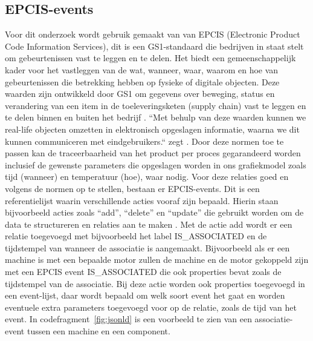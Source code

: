 \subsection{EPCIS-events}
Voor dit onderzoek wordt gebruik gemaakt van van EPCIS (Electronic Product Code Information Services), dit is een GS1-standaard die bedrijven in staat stelt om gebeurtenissen vast te leggen en te delen. 
Het biedt een gemeenschappelijk kader voor het vastleggen van de wat, wanneer, waar, waarom en hoe van gebeurtenissen die betrekking hebben op fysieke of digitale objecten. 
Deze waarden zijn ontwikkeld door GS1 om gegevens over beweging, status en verandering van een item in de toeleveringsketen (supply chain) vast te leggen en te delen binnen en buiten het bedrijf \autocite{Devins}.
``Met behulp van deze waarden kunnen we real-life objecten omzetten in elektronisch opgeslagen informatie, waarna we dit kunnen communiceren met eindgebruikers.`` zegt \textcite{Devins}.
Door deze normen toe te passen kan de traceerbaarheid van het product per proces gegarandeerd worden inclusief de gewenste parameters die opgeslagen worden in ons grafiekmodel zoals tijd (wanneer) en temperatuur (hoe), waar nodig.
Voor deze relaties goed en volgens de normen op te stellen, bestaan er EPCIS-events. Dit is een referentielijst waarin verschillende acties vooraf zijn bepaald.
Hierin staan bijvoorbeeld acties zoals ``add'', ``delete'' en ``update'' die gebruikt worden om de data te structureren en relaties aan te maken \autocite{Byun2020}.
Met de actie add wordt er een relatie toegevoegd met bijvoorbeeld het label IS\_ASSOCIATED en de tijdstempel van wanneer de associatie is aangemaakt.
Bijvoorbeeld als er een machine is met een bepaalde motor zullen de machine en de motor gekoppeld zijn met een EPCIS event IS\_ASSOCIATED die ook properties bevat zoals de tijdstempel van de associatie.
Bij deze actie worden ook properties toegevoegd in een event-lijst, daar wordt bepaald om welk soort event het gaat en worden eventuele extra parameters toegevoegd voor op de relatie, zoals de tijd van het event.
In codefragment~\ref{fig:jsonld} is een voorbeeld te zien van een associatie-event tussen een machine en een component.

